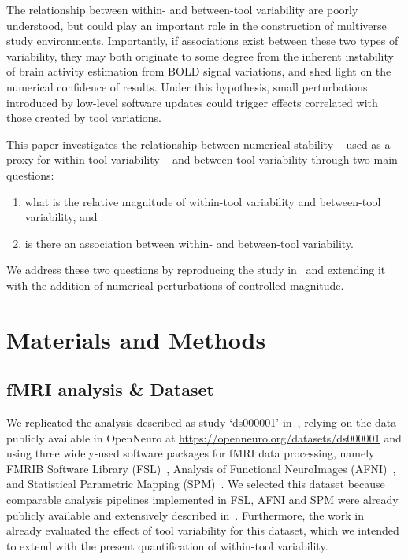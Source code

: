 \documentclass[11pt,onecolumn]{article}
\begin{document}
The relationship between within- and between-tool variability are poorly
understood, but could play an important role in the construction of
multiverse study environments. Importantly, if associations exist between
these two types of variability, they may both originate to some degree from
the inherent instability of brain activity estimation from BOLD signal
variations, and shed light on the numerical confidence of results. Under
this hypothesis, small perturbations introduced by low-level software
updates could trigger effects correlated with those created by tool
variations.

This paper investigates the relationship between numerical stability -- used
as a proxy for within-tool variability -- and between-tool variability
through two main questions:
\begin{enumerate}
\item what is the relative magnitude of within-tool variability and between-tool variability, and
\item is there an association between within- and between-tool variability.
\end{enumerate}

We address these two questions by reproducing the study in~\cite{bowring2019exploring} and
extending it with the addition of numerical perturbations of controlled
magnitude.

\section{Materials and Methods}

\subsection{fMRI analysis \& Dataset}

We replicated the analysis described as study `ds000001'
in~\cite{schonberg2012decreasing}, relying on the data publicly available
in OpenNeuro at \url{https://openneuro.org/datasets/ds000001} and using
three widely-used software packages for fMRI data processing, namely FMRIB
Software Library (FSL)~\cite{jenkinson2012fsl}, Analysis of Functional
NeuroImages (AFNI)~\cite{cox1996afni}, and Statistical Parametric
Mapping (SPM)~\cite{penny2011statistical}. We selected this dataset because
comparable analysis pipelines implemented in FSL, AFNI and SPM were already
publicly available and extensively described in~\cite{bowring2019exploring}.
Furthermore, the work in~\cite{bowring2019exploring} already evaluated the
effect of tool variability for this dataset, which we intended to
extend with the present quantification of within-tool variability.
\end{document}
